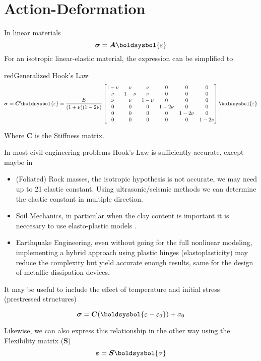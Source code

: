 \documentclass[a4paper, 11pt,article,oneside]{memoir}%
\begin{document}
\section{Action-Deformation}
In linear materials   
\begin{equation*}\label{HookLaw}
\boldsymbol{\sigma}=\boldsymbol{A}\boldsysbol{\varepsilon}
\end{equation*}
For an isotropic linear-elastic material, the expression can be simplified to

\begin{eqbox2}{red}{Generalized Hook's Law}\
\begin{equation*}
\boldsymbol{\sigma}=\boldsymbol{C}\boldsysbol{\varepsilon}=\frac{E}{(1+\nu)(1-2\nu)}
\begin{bmatrix}
1-\nu&\nu&\nu&0&0&0\\
\nu&1-\nu&\nu&0&0&0\\
\nu&\nu&1-\nu&0&0&0\\
0&0&0&1-2\nu&0&0\\
0&0&0&0&1-2\nu&0\\
0&0&0&0&0&1-2\nu\\
\end{bmatrix}\boldsysbol{\varepsilon}
\end{equation*}
\end{eqbox2}
Where $\boldsymbol{C}$ is the Stiffness matrix.
\begin{note}
In most civil engineering  problems Hook's Law is sufficiently accurate, except  maybe in 
\begin{itemize}
\item (Foliated) Rock masses, the isotropic hypothesis is not accurate, we may need up to 21 elastic constant. Using ultrasonic/seismic methods we can determine the elastic constant in multiple direction\cite{CIVIL448}.
\item Soil Mechanics, in particular when the clay content is important it is neccesary to use elasto-plastic models \cite{ICE2614}.
\item Earthquake Engineering, even without going for the full nonlinear modeling, implementing a hybrid approach using plastic hinges (elastoplasticity) may reduce the complexity but yield accurate enough results, same for the design of metallic dissipation devices\cite{CIVIL467}.
\end{itemize}
\end{note}
It may be useful to include the effect of temperature and initial stress (prestressed structures)
\begin{eqbox}
\begin{equation*}
\boldsymbol{\sigma}=\boldsymbol{C}(\boldsysbol{\varepsilon-\varepsilon_0})+\sigma_0
\end{equation*}
\end{eqbox}
Likewise, we can also express this relationship in the other way using the Flexibility matrix ($\boldsymbol{S}$)
\begin{equation*}
\boldsymbol{\varepsilon}=\boldsymbol{S}\boldsysbol{\sigma}
\end{equation*}
\end{document}

